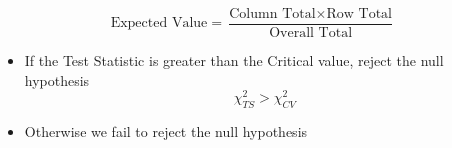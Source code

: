 \documentclass[]{article}
\begin{document}
\newpage
{
\huge
\[ \mbox{Expected Value}  = \frac{\mbox{Column Total} \times \mbox{Row Total}}{\mbox{Overall Total}} \]
}

\newpage

\begin{framed}
\begin{itemize}
\item If the Test Statistic is greater than the Critical value, reject the null hypothesis
\[ \chi^2_{TS} > \chi^2_{CV}\]

\item Otherwise we fail to reject the null hypothesis

\end{itemize}
\end{framed}
\end{document}
